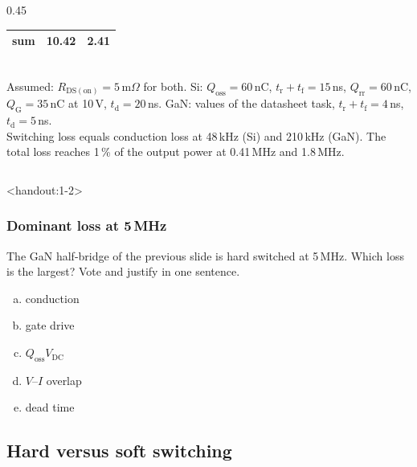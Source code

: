 \begin{frame}
\begin{columns}[T]
\begin{column}{0.45\textwidth}
\begin{tabular}{|l|r|r|}
				sum                                       & 10.42 & 2.41 \\
				\hline
			\end{tabular}\\[0.5em]
			Assumed: $R_\mathrm{DS(on)}=5$\,m$\Omega$ for both. Si: $Q_\mathrm{oss}=60$\,nC, $t_\mathrm{r}+t_\mathrm{f}=15$\,ns, $Q_\mathrm{rr}=60$\,nC, $Q_\mathrm{G}=35$\,nC at 10\,V, $t_\mathrm{d}=20$\,ns. GaN: values of the datasheet task, $t_\mathrm{r}+t_\mathrm{f}=4$\,ns, $t_\mathrm{d}=5$\,ns.\\[0.5em]
			Switching loss equals conduction loss at 48\,kHz (Si) and 210\,kHz (GaN). The total loss reaches 1\,\% of the output power at 0.41\,MHz and 1.8\,MHz.
		\end{column}
	\end{columns}
\end{frame}

\begin{frame}<handout:1-2>
	\frametitle{Dominant loss at 5\,MHz}
	The GaN half-bridge of the previous slide is hard switched at 5\,MHz. Which loss is the largest? Vote and justify in one sentence.
	\begin{enumerate}[(a)]
		\item conduction
		\item gate drive
		\item $Q_\mathrm{oss}V_\mathrm{DC}$
		\item $V$--$I$ overlap
		\item dead time
	\end{enumerate}
\end{frame}

\subsection{Hard versus soft switching}


